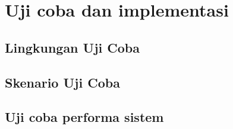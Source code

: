 \chapter{Uji coba dan implementasi}
    \section{Lingkungan Uji Coba}
        \Blindtext[5][1]
    \section{Skenario Uji Coba}
        \Blindtext[5][1]
    \section{Uji coba performa sistem}
        \Blindtext[5][1]
    \cleardoublepage

